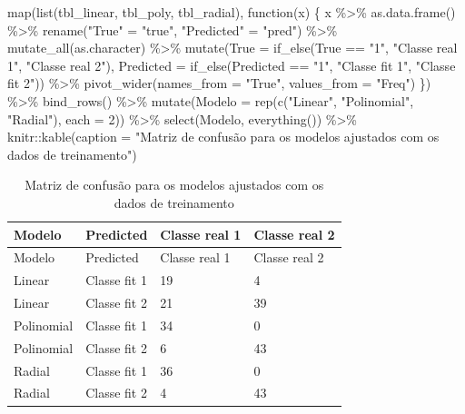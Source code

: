 \documentclass[
  a4paperpaper,
]{article}
\newenvironment{Shaded}{\begin{snugshade}}{\end{snugshade}}
\newcommand{\AttributeTok}[1]{\textcolor[rgb]{0.40,0.45,0.13}{#1}}
\newcommand{\ControlFlowTok}[1]{\textcolor[rgb]{0.00,0.23,0.31}{#1}}
\newcommand{\DecValTok}[1]{\textcolor[rgb]{0.68,0.00,0.00}{#1}}
\newcommand{\FunctionTok}[1]{\textcolor[rgb]{0.28,0.35,0.67}{#1}}
\newcommand{\NormalTok}[1]{\textcolor[rgb]{0.00,0.23,0.31}{#1}}
\newcommand{\OtherTok}[1]{\textcolor[rgb]{0.00,0.23,0.31}{#1}}
\newcommand{\SpecialCharTok}[1]{\textcolor[rgb]{0.37,0.37,0.37}{#1}}
\newcommand{\StringTok}[1]{\textcolor[rgb]{0.13,0.47,0.30}{#1}}
\begin{document}
\begin{Shaded}
\begin{Highlighting}[]
\FunctionTok{map}\NormalTok{(}\FunctionTok{list}\NormalTok{(tbl\_linear, tbl\_poly, tbl\_radial), }\ControlFlowTok{function}\NormalTok{(x) \{}
\NormalTok{  x }\SpecialCharTok{\%\textgreater{}\%}
    \FunctionTok{as.data.frame}\NormalTok{() }\SpecialCharTok{\%\textgreater{}\%}
    \FunctionTok{rename}\NormalTok{(}\StringTok{"True"} \OtherTok{=} \StringTok{"true"}\NormalTok{, }\StringTok{"Predicted"} \OtherTok{=} \StringTok{"pred"}\NormalTok{) }\SpecialCharTok{\%\textgreater{}\%}
    \FunctionTok{mutate\_all}\NormalTok{(as.character) }\SpecialCharTok{\%\textgreater{}\%}
    \FunctionTok{mutate}\NormalTok{(}\AttributeTok{True =} \FunctionTok{if\_else}\NormalTok{(True }\SpecialCharTok{==} \StringTok{"1"}\NormalTok{, }\StringTok{"Classe real 1"}\NormalTok{, }\StringTok{"Classe real 2"}\NormalTok{),}
           \AttributeTok{Predicted =} \FunctionTok{if\_else}\NormalTok{(Predicted }\SpecialCharTok{==} \StringTok{"1"}\NormalTok{, }\StringTok{"Classe fit 1"}\NormalTok{, }\StringTok{"Classe fit 2"}\NormalTok{)) }\SpecialCharTok{\%\textgreater{}\%}
    \FunctionTok{pivot\_wider}\NormalTok{(}\AttributeTok{names\_from =} \StringTok{"True"}\NormalTok{, }\AttributeTok{values\_from =} \StringTok{"Freq"}\NormalTok{)}
\NormalTok{\}) }\SpecialCharTok{\%\textgreater{}\%}
  \FunctionTok{bind\_rows}\NormalTok{() }\SpecialCharTok{\%\textgreater{}\%}
  \FunctionTok{mutate}\NormalTok{(}\AttributeTok{Modelo =} \FunctionTok{rep}\NormalTok{(}\FunctionTok{c}\NormalTok{(}\StringTok{"Linear"}\NormalTok{, }\StringTok{"Polinomial"}\NormalTok{, }\StringTok{"Radial"}\NormalTok{), }\AttributeTok{each =} \DecValTok{2}\NormalTok{)) }\SpecialCharTok{\%\textgreater{}\%}
  \FunctionTok{select}\NormalTok{(Modelo, }\FunctionTok{everything}\NormalTok{()) }\SpecialCharTok{\%\textgreater{}\%}
\NormalTok{  knitr}\SpecialCharTok{::}\FunctionTok{kable}\NormalTok{(}\AttributeTok{caption =} \StringTok{"Matriz de confusão para os modelos ajustados com os dados de treinamento"}\NormalTok{)}
\end{Highlighting}
\end{Shaded}

\begin{longtable}[]{@{}llll@{}}
\caption{Matriz de confusão para os modelos ajustados com os dados de
treinamento}\tabularnewline
\toprule\noalign{}
Modelo & Predicted & Classe real 1 & Classe real 2 \\
\midrule\noalign{}
\endfirsthead
\toprule\noalign{}
Modelo & Predicted & Classe real 1 & Classe real 2 \\
\midrule\noalign{}
\endhead
\bottomrule\noalign{}
\endlastfoot
Linear & Classe fit 1 & 19 & 4 \\
Linear & Classe fit 2 & 21 & 39 \\
Polinomial & Classe fit 1 & 34 & 0 \\
Polinomial & Classe fit 2 & 6 & 43 \\
Radial & Classe fit 1 & 36 & 0 \\
Radial & Classe fit 2 & 4 & 43 \\
\end{longtable}
\end{document}
